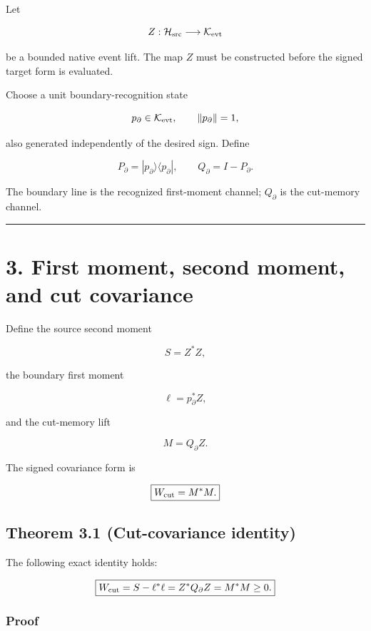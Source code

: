 Let

\[
Z:\mathcal H_{\rm src}\longrightarrow\mathcal K_{\rm evt}
\]

be a bounded native event lift. The map \(Z\) must be constructed before the
signed target form is evaluated.

Choose a unit boundary-recognition state

\[
p_\partial\in\mathcal K_{\rm evt},
\qquad
\|p_\partial\|=1,
\]

also generated independently of the desired sign. Define

\[
P_\partial
=|p_\partial\rangle\langle p_\partial|,
\qquad
Q_\partial=I-P_\partial.
\]

The boundary line is the recognized first-moment channel; \(Q_\partial\) is the
cut-memory channel.

\begin{center}\rule{0.5\linewidth}{0.5pt}\end{center}

\hypertarget{first-moment-second-moment-and-cut-covariance}{%
\section{3. First moment, second moment, and cut covariance}\label{first-moment-second-moment-and-cut-covariance}}

Define the source second moment

\[
\boxed{
S=Z^*Z,
}
\]

the boundary first moment

\[
\boxed{
\ell=p_\partial^*Z,
}
\]

and the cut-memory lift

\[
\boxed{
M=Q_\partial Z.
}
\]

The signed covariance form is

\[
\boxed{
W_{\rm cut}=M^*M.
}
\]

\hypertarget{theorem-3.1-cut-covariance-identity}{%
\subsection{Theorem 3.1 (Cut-covariance identity)}\label{theorem-3.1-cut-covariance-identity}}

The following exact identity holds:

\[
\boxed{
W_{\rm cut}
=S-\ell^*\ell
=Z^*Q_\partial Z
=M^*M
\ge0.
}
\]

\hypertarget{proof}{%
\subsubsection{Proof}\label{proof}}

